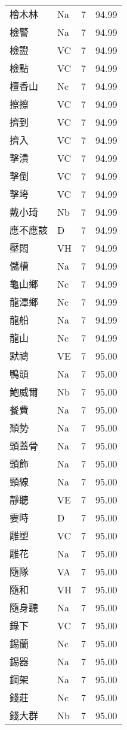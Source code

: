 \documentclass[twocolumn]{book}
\begin{document}
\begin{supertabular}{llrr}
檜木林 & Na & 7 &  94.99\\
檢警 & Na & 7 &  94.99\\
檢證 & VC & 7 &  94.99\\
檢點 & VC & 7 &  94.99\\
檀香山 & Nc & 7 &  94.99\\
擦擦 & VC & 7 &  94.99\\
擠到 & VC & 7 &  94.99\\
擠入 & VC & 7 &  94.99\\
擊潰 & VC & 7 &  94.99\\
擊倒 & VC & 7 &  94.99\\
擊垮 & VC & 7 &  94.99\\
戴小琦 & Nb & 7 &  94.99\\
應不應該 & D & 7 &  94.99\\
壓悶 & VH & 7 &  94.99\\
儲槽 & Na & 7 &  94.99\\
龜山鄉 & Nc & 7 &  94.99\\
龍潭鄉 & Nc & 7 &  94.99\\
龍船 & Na & 7 &  94.99\\
龍山 & Nc & 7 &  94.99\\
默禱 & VE & 7 &  95.00\\
鴨頭 & Na & 7 &  95.00\\
鮑威爾 & Nb & 7 &  95.00\\
餐費 & Na & 7 &  95.00\\
頹勢 & Na & 7 &  95.00\\
頭蓋骨 & Na & 7 &  95.00\\
頭飾 & Na & 7 &  95.00\\
頸線 & Na & 7 &  95.00\\
靜聽 & VE & 7 &  95.00\\
霎時 & D & 7 &  95.00\\
雕塑 & VC & 7 &  95.00\\
雕花 & Na & 7 &  95.00\\
隨隊 & VA & 7 &  95.00\\
隨和 & VH & 7 &  95.00\\
隨身聽 & Na & 7 &  95.00\\
錄下 & VC & 7 &  95.00\\
錫蘭 & Nc & 7 &  95.00\\
錫器 & Na & 7 &  95.00\\
鋼架 & Na & 7 &  95.00\\
錢莊 & Nc & 7 &  95.00\\
錢大群 & Nb & 7 &  95.00\\

\end{supertabular}
\end{document}
